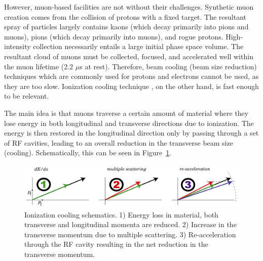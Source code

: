 \documentclass[a4paper,11pt]{article}
\begin{document}
However, muon-based facilities are not without their challenges. Synthetic muon creation comes from the collision of protons with a fixed target. The resultant spray of particles largely contains kaons (which decay primarily into pions and muons), pions (which decay primarily into muons), and rogue protons. High-intensity collection necessarily entails a large initial phase space volume. The resultant cloud of muons must be collected, focused, and accelerated well within the muon lifetime (2.2 $\mu$s at rest). Therefore, beam cooling (beam size reduction) techniques which are commonly used for protons and electrons cannot be used, as they are too slow. Ionization cooling technique \cite{Parkhomchuk}, on the other hand, is fast enough to be relevant. 




\iffalse
The main idea is that muons traverse a certain amount of material where they lose energy in both longitudinal and transverse directions due to ionization. The energy is then restored in the longitudinal direction only by passing through a set of RF cavities, leading to an overall reduction in the transverse beam size (cooling). Schematically, this can be seen in Figure~\ref{fig:cooling_vector}.

\begin{figure}[htb] 
\centering
\includegraphics[width=\columnwidth]{Figures/cooling_vector}
\caption{Ionization cooling schematics. 1) Energy loss in material, both transverse and longitudinal momenta are reduced. 2) Increase in the transverse momentum due to multiple scattering.  3) Re-acceleration through the RF cavity resulting in the net reduction in the transverse momentum.}
\label{fig:cooling_vector}
\end{figure}
\end{document}
